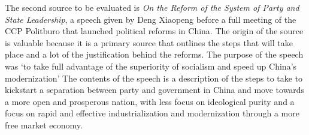 \documentclass[../main.tex]{subfiles}
\begin{document}
The second source to be evaluated is \textit{On the Reform of the System of Party and State Leadership}, a speech given by Deng Xiaopeng before a full meeting of the CCP Politburo that launched political reforms in China. The origin of the source is valuable because it is a primary source that outlines the steps that will take place and a lot of the justification behind the reforms. The purpose of the speech was ‘to take full advantage of the superiority of socialism and speed up China's modernization’ The contents of the speech is a description of the steps to take to kickstart a separation between party and government in China and move towards a more open and prosperous nation, with less focus on ideological purity and a focus on rapid and effective industrialization and modernization through a more free market economy.
\end{document}
